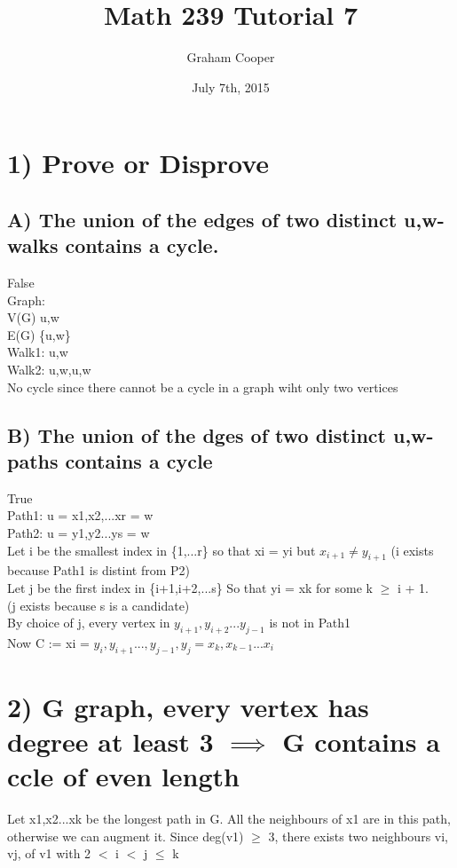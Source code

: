 \documentclass[12pt]{article}
\title{\vspace{-15ex}Math 239 Tutorial 7\vspace{-1ex}}
\date{July 7th, 2015}
\author{Graham Cooper}
\begin{document}
	\maketitle
	\section*{1) Prove or Disprove}
	\subsection*{A) The union of the edges of two distinct u,w-walks contains a cycle.}
	False\\
	Graph:\\
	V(G) u,w\\
	E(G) \{u,w\}\\
	Walk1: u,w\\
	Walk2: u,w,u,w\\
	
	No cycle since there cannot be a cycle in a graph wiht only two vertices\\
	\subsection*{B) The union of the dges of two distinct u,w-paths contains a cycle}
	True\\
	Path1: u = x1,x2,...xr = w\\
	Path2: u = y1,y2...ys = w\\
	Let i be the smallest index in \{1,...r\} so that xi = yi but $x_{i+1} \ne y_{i+1}$ (i exists because Path1 is distint from P2)\\
	Let j be the first index in \{i+1,i+2,...s\} So that yi = xk for some k $\geq$ i + 1.\\
	(j exists because s is a candidate)\\
	By choice of j, every vertex in $y_{i+1}, y_{i+2}...y_{j-1}$ is not in Path1\\
	Now C := xi = $y_i, y_{i+1}...,y_{j-1},y_j = x_k, x_{k-1}...x_i$\\
	
	\section*{2) G graph, every vertex has degree at least 3 $\implies$ G contains a ccle of even length}
	Let x1,x2...xk be the longest path in G. All the neighbours of x1 are in this path, otherwise we can augment it. Since deg(v1) $\geq$ 3, there exists two neighbours vi, vj, of v1 with 2 $<$ i $<$ j $\leq$ k\\
	
\end{document}
